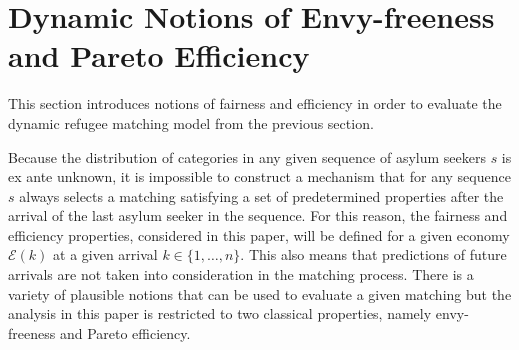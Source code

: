 \documentclass[12pt,fleqn]{article}
\begin{document}
\section{Dynamic Notions of Envy-freeness and Pareto Efficiency}\label{SEC:Fair_Efficient}
This section introduces notions of fairness and efficiency in order to evaluate the dynamic refugee matching model from the previous section.

Because the distribution of categories in any given sequence of asylum seekers $s$ is ex ante unknown, it is impossible to construct a mechanism that for any sequence $s$ always selects a matching satisfying a set of predetermined properties after the arrival of the last asylum seeker in the sequence. For this reason, the fairness and efficiency properties, considered in this paper, will be defined for a given economy $\mathcal{E}(k)$ at a given arrival $k\in\{1,\ldots,n\}$. This also means that predictions of future arrivals are not taken into consideration in the matching process. There is a variety of plausible notions that can be used to evaluate a given matching but the analysis in this paper is restricted to two classical properties, namely envy-freeness and Pareto efficiency.
\end{document}
